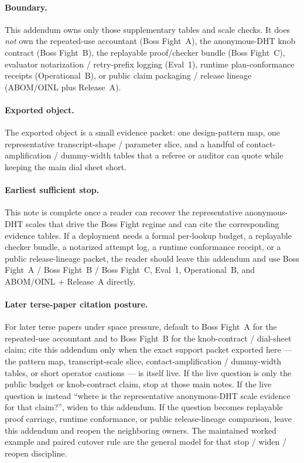 \documentclass[11pt]{article}
\begin{document}
\paragraph{Boundary.}
This addendum owns only those supplementary tables and scale checks.
It does \emph{not} own the repeated-use accountant (Boss Fight~A), the anonymous-DHT knob contract (Boss Fight~B), the replayable proof/checker bundle (Boss Fight~C), evaluator notarization / retry-prefix logging (Eval~1), runtime plan-conformance receipts (Operational~B), or public claim packaging / release lineage (ABOM/OINL plus Release~A).\cite{series:bossfightA,series:bossfightB,series:bossfightC,series:evalnotary,series:opB,series:abomoinl,series:releaseproperty}

\paragraph{Exported object.}
The exported object is a small evidence packet: one design-pattern map, one representative transcript-shape / parameter slice, and a handful of contact-amplification / dummy-width tables that a referee or auditor can quote while keeping the main dial sheet short.

\paragraph{Earliest sufficient stop.}
This note is complete once a reader can recover the representative anonymous-DHT scales that drive the Boss Fight regime and can cite the corresponding evidence tables.
If a deployment needs a formal per-lookup budget, a replayable checker bundle, a notarized attempt log, a runtime conformance receipt, or a public release-lineage packet, the reader should leave this addendum and use Boss Fight~A / Boss Fight~B / Boss Fight~C, Eval~1, Operational~B, and ABOM/OINL + Release~A directly.\cite{series:bossfightA,series:bossfightB,series:bossfightC,series:evalnotary,series:opB,series:abomoinl,series:releaseproperty}

\paragraph{Later terse-paper citation posture.}
For later terse papers under space pressure, default to Boss Fight~A for the repeated-use accountant and to Boss Fight~B for the knob-contract / dial-sheet claim; cite this addendum only when the exact support packet exported here --- the pattern map, transcript-scale slice, contact-amplification / dummy-width tables, or short operator cautions --- is itself live.
If the live question is only the public budget or knob-contract claim, stop at those main notes.
If the live question is instead ``where is the representative anonymous-DHT scale evidence for that claim?'', widen to this addendum.
If the question becomes replayable proof carriage, runtime conformance, or public release-lineage comparison, leave this addendum and reopen the neighboring owners.
The maintained worked example and paired cutover rule are the general model for that stop / widen / reopen discipline.\cite{series:workedexample,series:pairedterminalcutoverrules}
\end{document}
